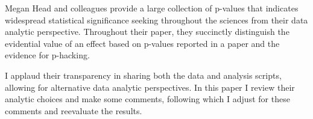 Megan Head and colleagues provide a large collection of p-values that indicates widespread statistical significance seeking throughout the sciences from their data analytic perspective. Throughout their paper, they succinctly distinguish the evidential value of an effect based on p-values reported in a paper and the evidence for p-hacking.

I applaud their transparency in sharing both the data and analysis scripts, allowing for alternative data analytic perspectives. In this paper I review their analytic choices and make some comments, following which I adjust for these comments and reevaluate the results.